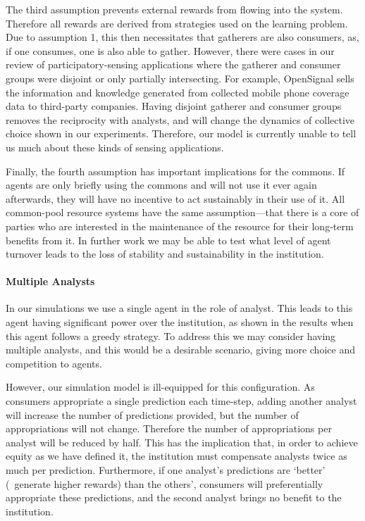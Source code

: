 The third assumption prevents external rewards from flowing into the system.
Therefore all rewards are derived from strategies used on the learning
problem. Due to assumption 1, this then necessitates that gatherers are also
consumers, as, if one consumes, one is also able to gather. However, there were
cases in our review of participatory-sensing applications where the gatherer
and consumer groups were disjoint or only partially intersecting. For example,
OpenSignal sells the information and knowledge generated from collected
mobile phone coverage data to third-party companies. Having disjoint gatherer
and consumer groups removes the reciprocity with analysts, and will change the
dynamics of collective choice shown in our experiments. Therefore,
our model is currently unable to tell us much about these kinds of sensing
applications.

Finally, the fourth assumption has important implications for the commons. If
agents are only briefly using the commons and  will not use it ever again
afterwards, they will have no incentive to act sustainably in their use of it.
All common-pool resource systems have the same assumption---that there is a
core of parties who are interested in the maintenance of the resource for
their long-term benefits from it.  In further work we may be able to test what
level of agent turnover leads to the loss of stability and sustainability in
the institution.

\paragraph{Multiple Analysts}  In our simulations we use a single agent in the
role of analyst. This leads to this agent having significant power over the
institution, as shown in the results when this agent follows a greedy
strategy. To address this we may consider having multiple analysts, and this
would be a desirable scenario, giving more choice and competition to agents.

However, our simulation model is ill-equipped for this configuration. As
consumers appropriate a single prediction each time-step, adding another
analyst will increase the number of predictions provided, but the number 
of appropriations will not change. Therefore the number of appropriations 
per analyst will be reduced by half. This has
the implication that, in order to achieve equity as we have defined it, the
institution must compensate analysts twice as much per prediction.
Furthermore, if one analyst's predictions are `better' (\ie\ generate higher rewards) than the others', consumers will preferentially appropriate these
predictions, and the second analyst brings no benefit to the institution.


